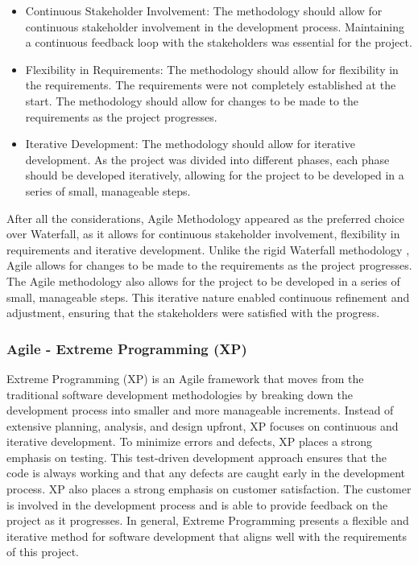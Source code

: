 \begin{itemize}
    \item Continuous Stakeholder Involvement: The methodology should allow for continuous stakeholder involvement in the development process. Maintaining a continuous feedback loop with the 
    stakeholders was essential for the project. 
    \item Flexibility in Requirements: The methodology should allow for flexibility in the requirements. The requirements were not completely established at the start. The methodology should allow for changes to be made to the requirements as the project progresses.
    \item Iterative Development: The methodology should allow for iterative development. As the project was divided into different phases, each phase should be developed iteratively, allowing for the project to be developed in a series of small, manageable steps.    
\end{itemize}

After all the considerations, Agile Methodology \cite{despa2014comparative} appeared as the preferred choice over Waterfall, as it allows for continuous stakeholder involvement, flexibility in requirements and iterative development.
Unlike the rigid Waterfall methodology \cite{despa2014comparative}, Agile allows for changes to be made to the requirements as the project progresses. The Agile methodology also allows for the project to be developed in a series of small, manageable steps.
This iterative nature enabled continuous refinement and adjustment, ensuring that the stakeholders were satisfied with the progress.

\subsubsection*{Agile - Extreme Programming (XP)}
Extreme Programming (XP) is an Agile framework that moves from the traditional software development methodologies by breaking down the development process into smaller and more manageable increments.
Instead of extensive planning, analysis, and design upfront, XP focuses on continuous and iterative development. To minimize errors and defects, XP places a strong emphasis on testing.
This test-driven development approach ensures that the code is always working and that any defects are caught early in the development process.
XP also places a strong emphasis on customer satisfaction. The customer is involved in the development process and is able to provide feedback on the project as it progresses. \cite{despa2014comparative} 
In general, Extreme Programming presents a flexible and iterative method for software development that aligns well with the requirements of this project.

